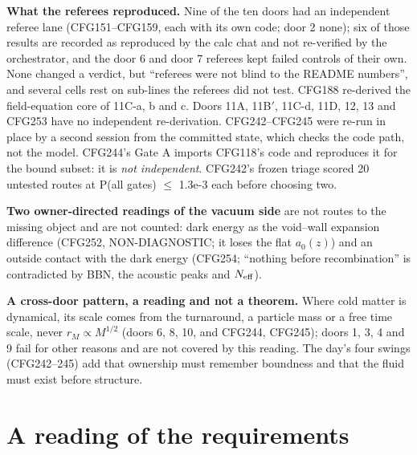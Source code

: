 \documentclass[10pt]{article}
\begin{document}
\textbf{What the referees reproduced.} Nine of the ten doors had an independent referee lane (CFG151--CFG159, each with its own code; door 2 none); six of those results are recorded as reproduced by the calc chat and not re-verified by the orchestrator, and the door 6 and door 7 referees kept failed controls of their own. None changed a verdict, but ``referees were not blind to the README numbers'', and several cells rest on sub-lines the referees did not test. CFG188 re-derived the field-equation core of 11C-a, b and c. Doors 11A, 11B$'$, 11C-d, 11D, 12, 13 and CFG253 have no independent re-derivation. CFG242--CFG245 were re-run in place by a second session from the committed state, which checks the code path, not the model. CFG244's Gate A imports CFG118's code and reproduces it for the bound subset: it is \emph{not independent}. CFG242's frozen triage scored 20 untested routes at P(all gates) $\le$ 1.3e-3 each before choosing two.

\textbf{Two owner-directed readings of the vacuum side} are not routes to the missing object and are not counted: dark energy as the void--wall expansion difference (CFG252, NON-DIAGNOSTIC; it loses the flat $a_0(z)$) and an outside contact with the dark energy (CFG254; ``nothing before recombination'' is contradicted by BBN, the acoustic peaks and $N_{\rm eff}$).

\textbf{A cross-door pattern, a reading and not a theorem.} Where cold matter is dynamical, its scale comes from the turnaround, a particle mass or a free time scale, never $r_M\propto M^{1/2}$ (doors 6, 8, 10, and CFG244, CFG245); doors 1, 3, 4 and 9 fail for other reasons and are not covered by this reading. The day's four swings (CFG242--245) add that ownership must remember boundness and that the fluid must exist before structure.

\section{A reading of the requirements}\label{sec:spec}
\end{document}
